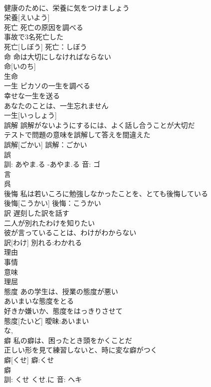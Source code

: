 \documentclass[8pt]{extreport}
\begin{document}
\begin{CJK}{UTF8}{min}
\\	健康のために、栄養に気をつけましょう 
\\	栄養[えいよう]						
\\	死亡	死亡の原因を調べる 
\\	事故で3名死亡した 
\\	死亡[しぼう]			死亡：しぼう
\\	命	命は大切にしなければならない 
\\	命[いのち]			
\\	生命 
\\	一生	ピカソの一生を調べる 
\\	幸せな一生を送る 
\\	あなたのことは、一生忘れません 
\\	一生[いっしょう]						
\\	誤解	誤解がないようにするには、よく話し合うことが大切だ 
\\	テストで問題の意味を誤解して答えを間違えた 
\\	誤解[ごかい]			誤解：ごかい
\\	誤 
\\	訓: あやま.る -あやま.る 音: ゴ 
\\	言 
\\	呉 
\\	後悔	私は若いころに勉強しなかったことを、とても後悔している 
\\	後悔[こうかい]			後悔：こうかい
\\	訳	遅刻した訳を話す 
\\	二人が別れたわけを知りたい 
\\	彼が言っていることは、わけがわからない 
\\	訳[わけ]			別れる:わかれる
\\	理由 
\\	事情 
\\	意味 
\\	理屈 
\\	態度	あの学生は、授業の態度が悪い 
\\	あいまいな態度をとる 
\\	好きか嫌いか、態度をはっきりさせて 
\\	態度[たいど]			曖昧:あいまい
\\	な, 
\\	癖	私の癖は、困ったとき頭をかくことだ 
\\	正しい形を見て練習しないと、時に変な癖がつく 
\\	癖[くせ]			癖:くせ
\\	癖 
\\	訓: くせ くせ.に 音: ヘキ 

\end{CJK}
\end{document}
